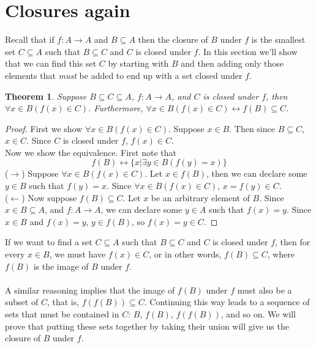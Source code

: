 \documentclass{report}
\newtheorem*{theorem}{Theorem}
\theoremstyle{definition}
\begin{document}
\section{Closures again}
Recall that if $f:A\to A$ and $B\subseteq A$ then the closure of $B$ under $f$ is the smallest set $C\subseteq A$ such that $B\subseteq C$ and $C$ is closed under $f$. 
In this section we'll show that we can find this set $C$ by starting with $B$ and then adding only those elements that \textit{must} be added to end up with a set closed under $f$. 
\begin{theorem}
Suppose $B\subseteq C\subseteq A$, $f:A\to A$, and $C$ is closed under $f$, then $\forall x\in B(f(x)\in C)$. Furthermore, $\forall x\in B(f(x)\in C)\leftrightarrow f(B)\subseteq C$.
\end{theorem}
\begin{proof}
First we show $\forall x\in B(f(x)\in C)$. Suppose $x\in B$. Then since $B\subseteq C$, $x\in C$. Since $C$ is closed under $f$, $f(x)\in C$.\\
\indent Now we show the equivalence. First note that
\begin{equation*}
f(B)\leftrightarrow \{x|\exists y\in B(f(y)=x)\}
\end{equation*}
\indent ($\rightarrow$) Suppose $\forall x\in B(f(x)\in C)$. Let $x\in f(B)$, then we can declare some $y\in B$ such that $f(y)=x$. Since $\forall x\in B(f(x)\in C)$, $x=f(y)\in C$.\\
\indent ($\leftarrow$) Now suppose $f(B)\subseteq C$. Let $x$ be an arbitrary element of $B$.
Since $x\in B\subseteq A$, and $f:A\to A$, we can declare some $y\in A$ such that $f(x)=y$.
Since $x\in B$ and $f(x)=y$, $y\in f(B)$, so $f(x)=y\in C$.
\end{proof}
\noindent If we want to find a set $C\subseteq A$ such that $B\subseteq C$ and $C$ is closed under $f$, then for every $x\in B$, we must have $f(x)\in C$, or in other words, $f(B)\subseteq C$, where
$f(B)$ is the image of $B$ under $f$.\\
\vspace{1mm}\\
A similar reasoning implies that the image of $f(B)$ under $f$ must also be a subset of $C$, that is, $f(f(B))\subseteq C$. Continuing this way leads to a sequence of sets that must be contained
in $C$: $B$, $f(B)$, $f(f(B))$, and so on. We will prove that putting these sets together by taking their union will give us the closure of $B$ under $f$.\\
\vspace{1mm}\\
\end{document}
